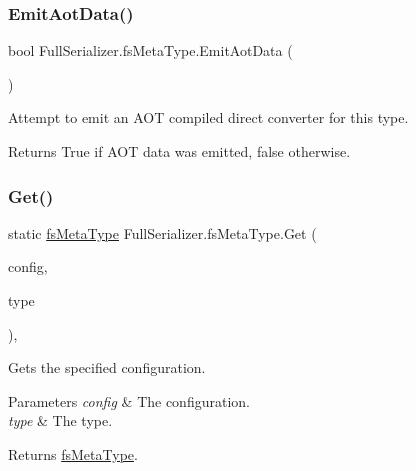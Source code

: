 \subsubsection{\texorpdfstring{Emit\+Aot\+Data()}{EmitAotData()}}
{\footnotesize\ttfamily bool Full\+Serializer.\+fs\+Meta\+Type.\+Emit\+Aot\+Data (\begin{DoxyParamCaption}{ }\end{DoxyParamCaption})\hspace{0.3cm}{\ttfamily [inline]}}



Attempt to emit an A\+OT compiled direct converter for this type. 

\begin{DoxyReturn}{Returns}
True if A\+OT data was emitted, false otherwise.
\end{DoxyReturn}
\mbox{\label{class_full_serializer_1_1fs_meta_type_a7958d481341e70175aae107ea82e329e}} 
\subsubsection{\texorpdfstring{Get()}{Get()}}
{\footnotesize\ttfamily static \hyperlink{class_full_serializer_1_1fs_meta_type}{fs\+Meta\+Type} Full\+Serializer.\+fs\+Meta\+Type.\+Get (\begin{DoxyParamCaption}\item[{\hyperlink{class_full_serializer_1_1fs_config}{fs\+Config}}]{config,  }\item[{Type}]{type }\end{DoxyParamCaption})\hspace{0.3cm}{\ttfamily [inline]}, {\ttfamily [static]}}



Gets the specified configuration. 


\begin{DoxyParams}{Parameters}
{\em config} & The configuration.\\
\hline
{\em type} & The type.\\
\hline
\end{DoxyParams}
\begin{DoxyReturn}{Returns}
\hyperlink{class_full_serializer_1_1fs_meta_type}{fs\+Meta\+Type}.
\end{DoxyReturn}


